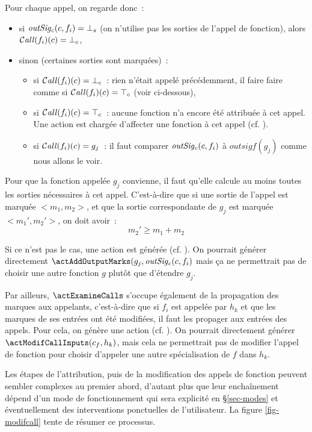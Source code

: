 Pour chaque appel, on regarde donc~:
\begin{itemize}
  \item si $\mathit{outSig_c}(c, f_i) = {\bot}_s$ (on n'utilise pas les sorties de l'appel
    de fonction), alors $\operatorname{\mathcal{C\mathit{all}}}(f_i)(c) = {\bot}_c$,
  \item sinon (certaines sorties sont marquées)~:
    \begin{itemize}
      \item si $\operatorname{\mathcal{C\mathit{all}}}(f_i)(c) = {\bot}_c$~:
	rien n'était appelé précédemment, il faire faire comme si 
	$\operatorname{\mathcal{C\mathit{all}}}(f_i)(c) = {\top}_c$ (voir ci-dessous),
      \item si $\operatorname{\mathcal{C\mathit{all}}}(f_i)(c) = {\top}_c$~:
	aucune fonction n'a encore été attribuée à cet appel.
	Une action \actChooseCall est chargée d'affecter une fonction à cet
	appel (cf. ).
      \item si $\operatorname{\mathcal{C\mathit{all}}}(f_i)(c) = g_j$~: il faut comparer $\mathit{outSig_c}(c, f_i)$ à
	$outsigf(g_j)$ comme nous allons le voir.
    \end{itemize}
\end{itemize}

Pour que la fonction appelée $g_j$ convienne, il faut qu'elle calcule au moins
toutes les sorties nécessaires à cet appel. C'est-à-dire que si une sortie de
l'appel est marquée $<m_1, m_2>$, et que la sortie correspondante de $g_j$ est
marquée $<m_1', m_2'>$, on doit avoir~:
\begin{equation*}
m_2' \geq m_1 + m_2
\end{equation*}

Si ce n'est pas le cas, une action \actMissingOutputs{} est générée
(cf. ).
On pourrait générer directement $\actAddOutputMarks(g_j, \outsigc(c, f_i)$ mais
ça ne permettrait pas de choisir une autre fonction $g$ plutôt que d'étendre
$g_j$.
\bb

Par ailleurs, $\actExamineCalls$ s'occupe également de la propagation des
marques aux appelants, c'est-à-dire que si $f_i$ est appelée par $h_k$ et que
les marques de ses entrées ont été modifiées, il faut les propager aux entrées
des appels.  Pour cela, on génère une action \actMissingInputs
(cf. ).  On
pourrait directement générer $\actModifCallInputs(c_f, h_k)$, mais cela ne
permettrait pas de modifier l'appel de fonction pour choisir d'appeler une autre
spécialisation de $f$ dans $h_k$.

Les étapes de l'attribution, puis de la modification des appels de fonction
peuvent sembler complexes au premier abord, 
d'autant plus que leur enchaînement dépend d'un mode
de fonctionnement qui sera explicité en \S\ref{sec-modes} et éventuellement des
interventions ponctuelles de l'utilisateur.
La figure \ref{fig-modifcall} tente de résumer ce processus.

